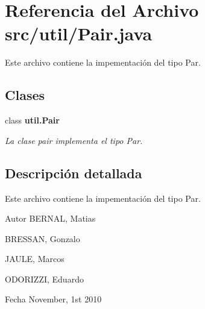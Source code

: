 \section{Referencia del Archivo src/util/Pair.java}
\label{_pair_8java}


Este archivo contiene la impementaci\'{o}n del tipo Par.  


\subsection*{Clases}
\begin{DoxyCompactItemize}
\item 
class {\bf util.Pair}
\begin{DoxyCompactList}\small\item\em La clase pair implementa el tipo Par. \item\end{DoxyCompactList}\end{DoxyCompactItemize}


\subsection{Descripción detallada}
Este archivo contiene la impementaci\'{o}n del tipo Par. \begin{DoxyAuthor}{Autor}
BERNAL, Matias\par
 BRESSAN, Gonzalo\par
 JAULE, Marcos\par
 ODORIZZI, Eduardo
\end{DoxyAuthor}
\begin{DoxyDate}{Fecha}
November, 1st 2010 
\end{DoxyDate}
